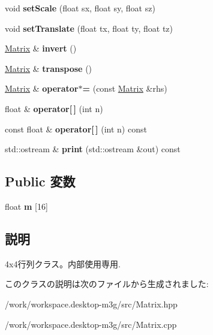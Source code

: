 \begin{CompactItemize}
\item 
\hypertarget{classm3g_1_1Matrix_937d04042c25021532ea2532fe5e3a32}{
void \textbf{setScale} (float sx, float sy, float sz)}
\label{classm3g_1_1Matrix_937d04042c25021532ea2532fe5e3a32}

\item 
\hypertarget{classm3g_1_1Matrix_550cf39dca5ec8d74d719b0dcdecdd4b}{
void \textbf{setTranslate} (float tx, float ty, float tz)}
\label{classm3g_1_1Matrix_550cf39dca5ec8d74d719b0dcdecdd4b}

\item 
\hypertarget{classm3g_1_1Matrix_f26a87130b4bbc951b85074a8c308a0e}{
\hyperlink{classm3g_1_1Matrix}{Matrix} \& \textbf{invert} ()}
\label{classm3g_1_1Matrix_f26a87130b4bbc951b85074a8c308a0e}

\item 
\hypertarget{classm3g_1_1Matrix_d27ed380c287f6489575eb838010cf72}{
\hyperlink{classm3g_1_1Matrix}{Matrix} \& \textbf{transpose} ()}
\label{classm3g_1_1Matrix_d27ed380c287f6489575eb838010cf72}

\item 
\hypertarget{classm3g_1_1Matrix_5d28596666a27f88d74bacceaef9b326}{
\hyperlink{classm3g_1_1Matrix}{Matrix} \& \textbf{operator$\ast$=} (const \hyperlink{classm3g_1_1Matrix}{Matrix} \&rhs)}
\label{classm3g_1_1Matrix_5d28596666a27f88d74bacceaef9b326}

\item 
\hypertarget{classm3g_1_1Matrix_014a3abc30da6ad739fcce9aa3fa28fe}{
float \& \textbf{operator\mbox{[}$\,$\mbox{]}} (int n)}
\label{classm3g_1_1Matrix_014a3abc30da6ad739fcce9aa3fa28fe}

\item 
\hypertarget{classm3g_1_1Matrix_7aa4dbded39fe1de76fbb0f81b57085e}{
const float \& \textbf{operator\mbox{[}$\,$\mbox{]}} (int n) const }
\label{classm3g_1_1Matrix_7aa4dbded39fe1de76fbb0f81b57085e}

\item 
\hypertarget{classm3g_1_1Matrix_6fea17fa1532df3794f8cb39cb4f911f}{
std::ostream \& \textbf{print} (std::ostream \&out) const }
\label{classm3g_1_1Matrix_6fea17fa1532df3794f8cb39cb4f911f}

\end{CompactItemize}
\subsection*{Public 変数}
\begin{CompactItemize}
\item 
\hypertarget{classm3g_1_1Matrix_68147cce833d98b698183d68629e38d5}{
float \textbf{m} \mbox{[}16\mbox{]}}
\label{classm3g_1_1Matrix_68147cce833d98b698183d68629e38d5}

\end{CompactItemize}


\subsection{説明}
4x4行列クラス。内部使用専用. 

このクラスの説明は次のファイルから生成されました:\begin{CompactItemize}
\item 
/work/workspace.desktop-m3g/src/Matrix.hpp\item 
/work/workspace.desktop-m3g/src/Matrix.cpp\end{CompactItemize}
